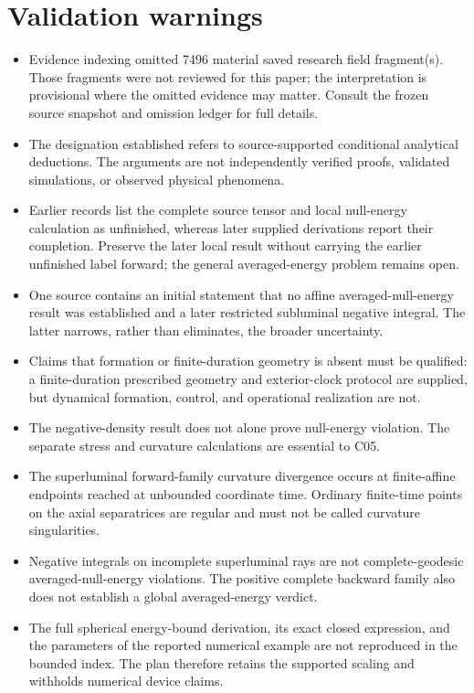 \documentclass[11pt]{article}
\begin{document}
\section*{Validation warnings}
\begin{itemize}
\item Evidence indexing omitted 7496 material saved research field fragment(s). Those fragments were not reviewed for this paper; the interpretation is provisional where the omitted evidence may matter. Consult the frozen source snapshot and omission ledger for full details.
\item The designation established refers to source-supported conditional analytical deductions. The arguments are not independently verified proofs, validated simulations, or observed physical phenomena.
\item Earlier records list the complete source tensor and local null-energy calculation as unfinished, whereas later supplied derivations report their completion. Preserve the later local result without carrying the earlier unfinished label forward; the general averaged-energy problem remains open.
\item One source contains an initial statement that no affine averaged-null-energy result was established and a later restricted subluminal negative integral. The latter narrows, rather than eliminates, the broader uncertainty.
\item Claims that formation or finite-duration geometry is absent must be qualified: a finite-duration prescribed geometry and exterior-clock protocol are supplied, but dynamical formation, control, and operational realization are not.
\item The negative-density result does not alone prove null-energy violation. The separate stress and curvature calculations are essential to C05.
\item The superluminal forward-family curvature divergence occurs at finite-affine endpoints reached at unbounded coordinate time. Ordinary finite-time points on the axial separatrices are regular and must not be called curvature singularities.
\item Negative integrals on incomplete superluminal rays are not complete-geodesic averaged-null-energy violations. The positive complete backward family also does not establish a global averaged-energy verdict.
\item The full spherical energy-bound derivation, its exact closed expression, and the parameters of the reported numerical example are not reproduced in the bounded index. The plan therefore retains the supported scaling and withholds numerical device claims.

\end{itemize}
\end{document}
